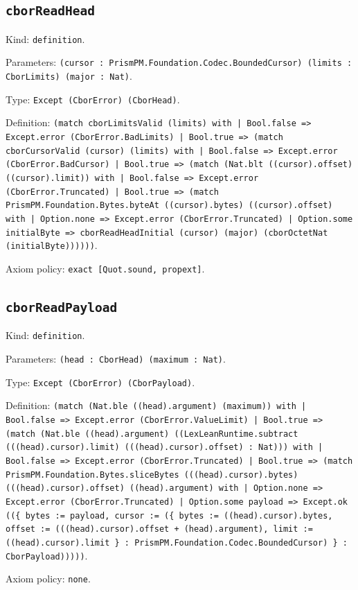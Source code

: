 \documentclass[11pt]{article}
\begin{document}
\subsection*{\texttt{cborReadHead}}
\noindent Kind: \texttt{definition}.\par
\noindent Parameters: \texttt{(cursor : PrismPM.Foundation.Codec.BoundedCursor) (limits : CborLimits) (major : Nat)}.\par
\noindent Type: \texttt{Except (CborError) (CborHead)}.\par
\noindent Definition: \texttt{(match cborLimitsValid (limits) with | Bool.false => Except.error (CborError.BadLimits) | Bool.true => (match cborCursorValid (cursor) (limits) with | Bool.false => Except.error (CborError.BadCursor) | Bool.true => (match (Nat.blt ((cursor).offset) ((cursor).limit)) with | Bool.false => Except.error (CborError.Truncated) | Bool.true => (match PrismPM.Foundation.Bytes.byteAt ((cursor).bytes) ((cursor).offset) with | Option.none => Except.error (CborError.Truncated) | Option.some initialByte => cborReadHeadInitial (cursor) (major) (cborOctetNat (initialByte))))))}.\par
\noindent Axiom policy: \texttt{exact [Quot.sound, propext]}.\par
\subsection*{\texttt{cborReadPayload}}
\noindent Kind: \texttt{definition}.\par
\noindent Parameters: \texttt{(head : CborHead) (maximum : Nat)}.\par
\noindent Type: \texttt{Except (CborError) (CborPayload)}.\par
\noindent Definition: \texttt{(match (Nat.ble ((head).argument) (maximum)) with | Bool.false => Except.error (CborError.ValueLimit) | Bool.true => (match (Nat.ble ((head).argument) ((LexLeanRuntime.subtract (((head).cursor).limit) (((head).cursor).offset) : Nat))) with | Bool.false => Except.error (CborError.Truncated) | Bool.true => (match PrismPM.Foundation.Bytes.sliceBytes (((head).cursor).bytes) (((head).cursor).offset) ((head).argument) with | Option.none => Except.error (CborError.Truncated) | Option.some payload => Except.ok ((\{ bytes := payload, cursor := (\{ bytes := ((head).cursor).bytes, offset := (((head).cursor).offset + (head).argument), limit := ((head).cursor).limit \} : PrismPM.Foundation.Codec.BoundedCursor) \} : CborPayload)))))}.\par
\noindent Axiom policy: \texttt{none}.\par
\end{document}
